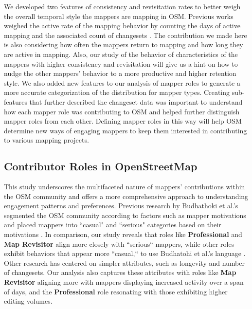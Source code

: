 \documentclass[manuscript,screen,review]{acmart}
\begin{document}
We developed two features of consistency and revisitation rates to better weigh the overall temporal style the mappers are mapping in OSM. Previous works weighed the active rate of the mapping behavior by counting the days of active mapping and the associated count of changesets \cite{Neis17}. The contribution we made here is also considering how often the mappers return to mapping and how long they are active in mapping. Also, our study of the behavior of characteristics of the mappers with higher consistency and revisitation will give us a hint on how to nudge the other mappers’ behavior to a more productive and higher retention style. We also added new features to our analysis of mapper roles to generate a more accurate categorization of the distribution for mapper types. Creating sub-features that further described the changeset data was important to understand how each mapper role was contributing to OSM and helped further distinguish mapper roles from each other. Defining mapper roles in this way will help OSM determine new ways of engaging mappers to keep them interested in contributing to various mapping projects. 

\subsection{Contributor Roles in OpenStreetMap}

This study underscores the multifaceted nature of mappers’ contributions within the OSM community and offers a more comprehensive approach to understanding engagement patterns and preferences. 
Previous research by Budhathoki et al.'s segmented the OSM community according to factors such as mapper motivations and placed mappers into ``casual" and ``serious" categories based on their motivations \cite{Budhathoki13}. 
In comparison, our study reveals that roles like \textbf{Professional} and \textbf{Map Revisitor} align more closely with ``serious`` mappers, while other roles exhibit behaviors that appear more ``casual,`` to use Budhatohi et al.'s language \cite{Budhathoki13}. 
Other research has centered on simpler attributes, such as longevity\cite{BeginDR18, Neis12, Neis17} and number of changesets\cite{Neis17}. 
Our analysis also captures these attributes with roles like \textbf{Map Revisitor} aligning more with mappers displaying increased activity over a span of days, and the \textbf{Professional} role resonating with those exhibiting higher editing volumes. 
\end{document}
